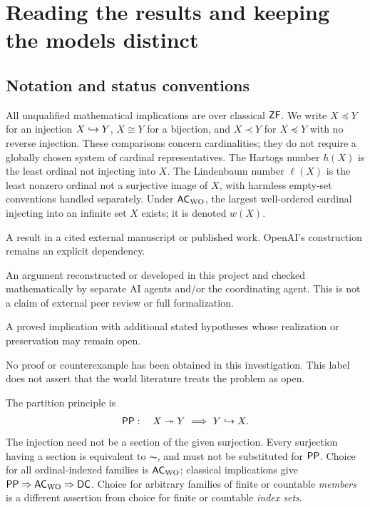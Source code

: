 \section{Reading the results and keeping the models distinct}
\label{sec:overview}
\subsection{Notation and status conventions}
All unqualified mathematical implications are over classical $\mathsf{ZF}$. We write $X\preccurlyeq Y$ for an injection $X\hookrightarrow Y$, $X\cong Y$ for a bijection, and $X\prec Y$ for $X\preccurlyeq Y$ with no reverse injection. These comparisons concern cardinalities; they do not require a globally chosen system of cardinal representatives. The Hartogs number $h(X)$ is the least ordinal not injecting into $X$. The Lindenbaum number $\ell(X)$ is the least nonzero ordinal not a surjective image of $X$, with harmless empty-set conventions handled separately. Under $\mathsf{AC}_{\mathrm{WO}}$, the largest well-ordered cardinal injecting into an infinite set $X$ exists; it is denoted $w(X)$.

\begin{description}[style=nextline]
\item[Source theorem.] A result in a cited external manuscript or published work. OpenAI's construction remains an explicit dependency.
\item[Audited deduction.] An argument reconstructed or developed in this project and checked mathematically by separate AI agents and/or the coordinating agent. This is not a claim of external peer review or full formalization.
\item[Conditional result.] A proved implication with additional stated hypotheses whose realization or preservation may remain open.
\item[Unresolved here.] No proof or counterexample has been obtained in this investigation. This label does not assert that the world literature treats the problem as open.
\end{description}

The partition principle is
\[
\mathsf{PP}:\quad X\twoheadrightarrow Y\ \Longrightarrow\ Y\hookrightarrow X.
\]
The injection need not be a section of the given surjection. Every surjection having a section is equivalent to $\AC$, and must not be substituted for $\mathsf{PP}$. Choice for all ordinal-indexed families is $\mathsf{AC}_{\mathrm{WO}}$; classical implications give $\mathsf{PP}\Rightarrow\mathsf{AC}_{\mathrm{WO}}\Rightarrow\mathsf{DC}$. Choice for arbitrary families of finite or countable \emph{members} is a different assertion from choice for finite or countable \emph{index sets}.

